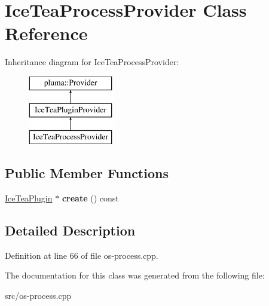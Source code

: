 \hypertarget{class_ice_tea_process_provider}{}\section{Ice\+Tea\+Process\+Provider Class Reference}
\label{class_ice_tea_process_provider}
Inheritance diagram for Ice\+Tea\+Process\+Provider\+:\begin{figure}[H]
\begin{center}
\leavevmode
\includegraphics[height=3.000000cm]{class_ice_tea_process_provider}
\end{center}
\end{figure}
\subsection*{Public Member Functions}
\begin{DoxyCompactItemize}
\item 
\hyperlink{class_ice_tea_plugin}{Ice\+Tea\+Plugin} $\ast$ {\bfseries create} () const \hypertarget{class_ice_tea_process_provider_a98810424709811260a370c0d34230853}{}\label{class_ice_tea_process_provider_a98810424709811260a370c0d34230853}

\end{DoxyCompactItemize}


\subsection{Detailed Description}


Definition at line 66 of file os-\/process.\+cpp.



The documentation for this class was generated from the following file\+:\begin{DoxyCompactItemize}
\item 
src/os-\/process.\+cpp\end{DoxyCompactItemize}

